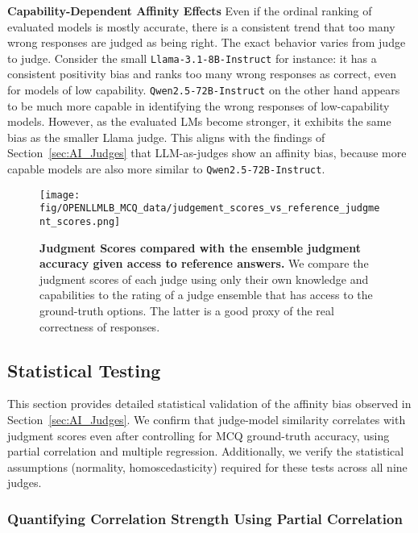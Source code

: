 \textbf{Capability-Dependent Affinity Effects} Even if the ordinal ranking of evaluated models is mostly accurate, there is a consistent trend that too many wrong responses are judged as being right. The exact behavior varies from judge to judge. Consider the small \texttt{Llama-3.1-8B-Instruct} for instance: it has a consistent positivity bias and ranks too many wrong responses as correct, even for models of low capability. \texttt{Qwen2.5-72B-Instruct} on the other hand appears to be much more capable in identifying the wrong responses of low-capability models. However, as the evaluated LMs become stronger, it exhibits the same bias as the smaller Llama judge. This aligns with the findings of Section~\ref{sec:AI_Judges} that LLM-as-judges show an affinity bias, because more capable models are also more similar to \texttt{Qwen2.5-72B-Instruct}.

\begin{figure}
    \centering
    \texttt{[image: fig/OPENLLMLB\_MCQ\_data/judgement\_scores\_vs\_reference\_judgment\_scores.png]}
    \caption{\textbf{Judgment Scores compared with the ensemble judgment accuracy given access to reference answers.} We compare the judgment scores of each judge using only their own knowledge and capabilities to the rating of a judge ensemble that has access to the ground-truth options. The latter is a good proxy of the real correctness of responses.}
    \label{fig:judge_ref_judge-plot}
\end{figure}


\subsection{Statistical Testing}
\label{app:judgestats}

This section provides detailed statistical validation of the affinity bias observed in Section~\ref{sec:AI_Judges}. We confirm that judge-model similarity correlates with judgment scores even after controlling for MCQ ground-truth accuracy, using partial correlation and multiple regression. Additionally, we verify the statistical assumptions (normality, homoscedasticity) required for these tests across all nine judges.

\subsubsection{Quantifying Correlation Strength Using Partial Correlation}
\label{app:pc}

